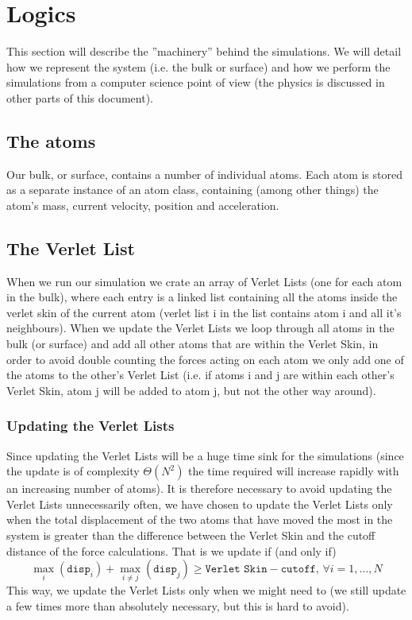 \section{Logics}
This section will describe the ''machinery'' behind the simulations. We will
detail how we represent the system (i.e. the bulk or surface) and how we perform
the simulations from a computer science point of view (the physics is discussed
in other parts of this document).
\subsection{The atoms}
Our bulk, or surface, contains a number of individual atoms. Each atom is stored
as a separate instance of an atom class, containing (among other things) the
atom's mass, current velocity, position and acceleration.
\subsection{The Verlet List}
When we run our simulation we crate an array of Verlet Lists (one for each atom
in the bulk), where each entry is a linked list containing all the atoms inside
the verlet skin of the current atom (verlet list i in the list contains atom i
and all it's neighbours). When we update the Verlet Lists we loop through all
atoms in the bulk (or surface) and add all other atoms that are within the
Verlet Skin, in order to avoid double counting the forces acting on each atom we
only add one of the atoms to the other's Verlet List (i.e. if atoms i and j are
within each other's Verlet Skin, atom j will be added to atom j, but not the
other way around).
\subsubsection{Updating the Verlet Lists}
Since updating the Verlet Lists will be a huge time sink for the simulations
(since the update is of complexity $\Theta(N^2)$ the time required will increase
rapidly with an increasing number of atoms). It is therefore necessary to avoid
updating the Verlet Lists unnecessarily often, we have chosen to update the
Verlet Lists only when the total displacement of the two atoms that have moved
the most in the system is greater than the difference between the Verlet Skin
and the cutoff distance of the force calculations.
That is we update if (and only if)
\[
\max_{i}(\texttt{disp}_i) + \max_{i \neq j}(\texttt{disp}_j) \geq
\texttt{Verlet Skin} - \texttt{cutoff},\, \forall i = 1,\ldots, N
\]
This way, we update the Verlet Lists only when we might need to (we still update
a few times more than absolutely necessary, but this is hard to avoid).

